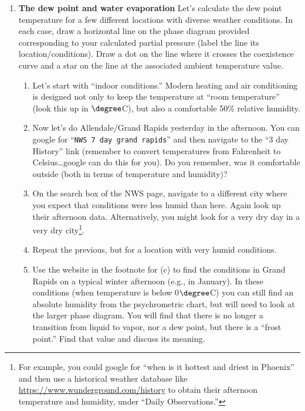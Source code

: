 \documentclass[12pt]{article}
\begin{document}
\begin{enumerate}

\item {\bf The dew point and water evaporation} Let's calculate the dew point temperature for a few different locations with diverse weather conditions.  In each case, draw a horizontal line on the phase diagram provided corresponding to your calculated partial pressure (label the line its location/conditions). Draw a dot on the line where it crosses the coexistence curve and a star on the line at the associated ambient temperature value.
	\begin{enumerate}
	\item Let's start with ``indoor conditions.'' Modern heating and air conditioning is designed not only to keep the temperature at ``room temperature'' (look this up in $\degree$C), but also a comfortable 50\% relative humidity.  
	\item Now let's do Allendale/Grand Rapids yesterday in the afternoon. You can google for ``\verb|NWS 7 day grand rapids|'' and then navigate to the ``3 day History'' link (remember to convert temperatures from Fahrenheit to Celsius\ldots google can do this for you). Do you remember, was it comfortable outside (both in terms of temperature and humidity)?  
	\item On the search box of the NWS page, navigate to a different city where you expect that conditions were less humid than here.  Again look up their afternoon data. Alternatively, you might look for a very dry day in a very dry city\footnote{For example, you could google for ``when is it hottest and driest in Phoenix'' and then use a historical weather database like \url{https://www.wunderground.com/history} to obtain their afternoon temperature and humidity, under ``Daily Observations.''}.
	\item Repeat the previous, but for a location with very humid conditions.
	\item Use the website in the footnote for (c) to find the conditions in Grand Rapids on a typical winter afternoon (e.g., in January).  In these conditions (when temperature is below 0$\degree$C) you can still find an absolute humidity from the psychrometric chart, but will need to look at the larger phase diagram.  You will find that there is no longer a transition from liquid to vapor, nor a dew point, but there is a ``frost point.'' Find that value and discuss its meaning.
	\end{enumerate}


\end{enumerate}
\end{document}
